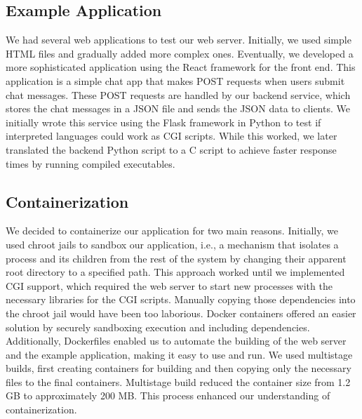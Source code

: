 \subsection*{Example Application}

We had several web applications to test our web server. Initially, we used simple HTML files and gradually added more complex ones. Eventually, we developed a more sophisticated application using the React framework for the front end. This application is a simple chat app that makes POST requests when users submit chat messages. These POST requests are handled by our backend service, which stores the chat messages in a JSON file and sends the JSON data to clients. We initially wrote this service using the Flask framework in Python to test if interpreted languages could work as CGI scripts. While this worked, we later translated the backend Python script to a C script to achieve faster response times by running compiled executables. 

\subsection*{Containerization}
We decided to containerize our application for two main reasons. Initially, we used chroot jails to sandbox our application, i.e., a mechanism that isolates a process and its children from the rest of the system by changing their apparent root directory to a specified path. This approach worked until we implemented CGI support, which required the web server to start new processes with the necessary libraries for the CGI scripts. Manually copying those dependencies into the chroot jail would have been too laborious. Docker containers offered an easier solution by securely sandboxing execution and including dependencies. Additionally, Dockerfiles enabled us to automate the building of the web server and the example application, making it easy to use and run. We used multistage builds, first creating containers for building and then copying only the necessary files to the final containers. Multistage build reduced the container size from 1.2 GB to approximately 200 MB. This process enhanced our understanding of containerization.
